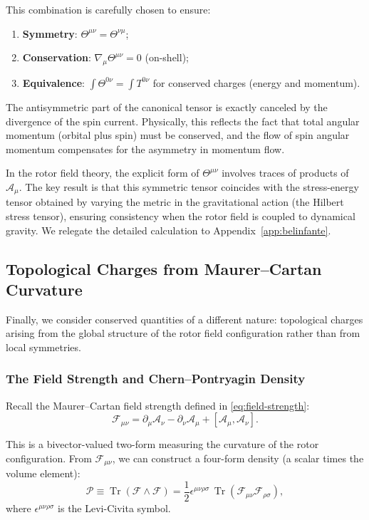 \documentclass[11pt,a4paper]{article}
\numberwithin{equation}{section}
\theoremstyle{plain}
\theoremstyle{definition}
\theoremstyle{remark}
\DeclareMathOperator{\Tr}{Tr}
\begin{document}
This combination is carefully chosen to ensure:

\begin{enumerate}
  \item \textbf{Symmetry}: $\Theta^{\mu\nu} = \Theta^{\nu\mu}$;
  \item \textbf{Conservation}: $\nabla_\mu \Theta^{\mu\nu} = 0$ (on-shell);
  \item \textbf{Equivalence}: $\int \Theta^{0\nu} = \int T^{0\nu}$ for conserved charges (energy and momentum).
\end{enumerate}

The antisymmetric part of the canonical tensor is exactly canceled by the divergence of the spin current. Physically, this reflects the fact that total angular momentum (orbital plus spin) must be conserved, and the flow of spin angular momentum compensates for the asymmetry in momentum flow.

In the rotor field theory, the explicit form of $\Theta^{\mu\nu}$ involves traces of products of $\mathcal{A}_\mu$. The key result is that this symmetric tensor coincides with the stress-energy tensor obtained by varying the metric in the gravitational action (the Hilbert stress tensor), ensuring consistency when the rotor field is coupled to dynamical gravity. We relegate the detailed calculation to Appendix~\ref{app:belinfante}.

\subsection{Topological Charges from Maurer--Cartan Curvature}

Finally, we consider conserved quantities of a different nature: topological charges arising from the global structure of the rotor field configuration rather than from local symmetries.

\subsubsection{The Field Strength and Chern--Pontryagin Density}

Recall the Maurer--Cartan field strength defined in \eqref{eq:field-strength}:
\begin{equation}
\mathcal{F}_{\mu\nu} = \partial_\mu\mathcal{A}_\nu - \partial_\nu\mathcal{A}_\mu + [\mathcal{A}_\mu, \mathcal{A}_\nu].
\end{equation}

This is a bivector-valued two-form measuring the curvature of the rotor configuration. From $\mathcal{F}_{\mu\nu}$, we can construct a four-form density (a scalar times the volume element):
\begin{equation}
\mathcal{P} \equiv \Tr(\mathcal{F}\wedge\mathcal{F}) = \frac{1}{2}\epsilon^{\mu\nu\rho\sigma}\,\Tr(\mathcal{F}_{\mu\nu}\mathcal{F}_{\rho\sigma}),
\label{eq:chern-pontryagin}
\end{equation}
where $\epsilon^{\mu\nu\rho\sigma}$ is the Levi-Civita symbol.
\end{document}
